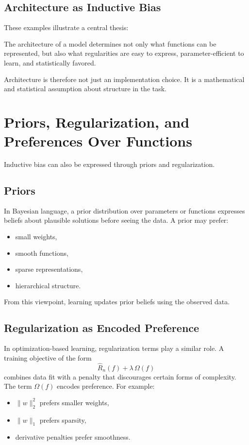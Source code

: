 \subsection{Architecture as Inductive Bias}

These examples illustrate a central thesis:

\begin{statement}
The architecture of a model determines not only what functions can be represented, but also what regularities are easy to express, parameter-efficient to learn, and statistically favored.
\end{statement}

Architecture is therefore not just an implementation choice. It is a mathematical and statistical assumption about structure in the task.

\section{Priors, Regularization, and Preferences Over Functions}

Inductive bias can also be expressed through priors and regularization.

\subsection{Priors}

In Bayesian language, a prior distribution over parameters or functions expresses beliefs about plausible solutions before seeing the data. A prior may prefer:
\begin{itemize}
    \item small weights,
    \item smooth functions,
    \item sparse representations,
    \item hierarchical structure.
\end{itemize}

From this viewpoint, learning updates prior beliefs using the observed data.

\subsection{Regularization as Encoded Preference}

In optimization-based learning, regularization terms play a similar role. A training objective of the form
\[
\widehat{R}_n(f) + \lambda \,\Omega(f)
\]
combines data fit with a penalty that discourages certain forms of complexity. The term $\Omega(f)$ encodes preference. For example:
\begin{itemize}
    \item $\|w\|_2^2$ prefers smaller weights,
    \item $\|w\|_1$ prefers sparsity,
    \item derivative penalties prefer smoothness.
\end{itemize}


